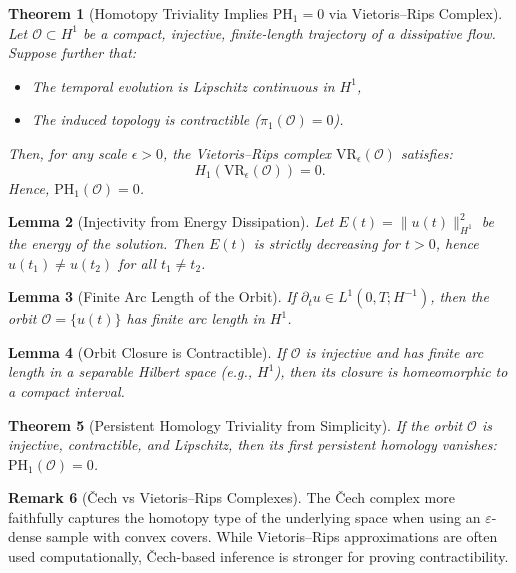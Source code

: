 \documentclass[11pt]{article}
\newtheorem{theorem}{Theorem}[section]
\newtheorem{lemma}[theorem]{Lemma}
\theoremstyle{definition}
\newtheorem{remark}[theorem]{Remark}
\begin{document}
\begin{theorem}[Homotopy Triviality Implies PH$_1 = 0$ via Vietoris–Rips Complex]
\label{thm:ph1_zero_vr}
Let $\mathcal{O} \subset H^1$ be a compact, injective, finite-length trajectory of a dissipative flow. Suppose further that:
\begin{itemize}
  \item The temporal evolution is Lipschitz continuous in $H^1$,
  \item The induced topology is contractible ($\pi_1(\mathcal{O}) = 0$).
\end{itemize}
Then, for any scale $\epsilon > 0$, the Vietoris--Rips complex $\mathrm{VR}_\epsilon(\mathcal{O})$ satisfies:
\[ H_1(\mathrm{VR}_\epsilon(\mathcal{O})) = 0. \]
Hence, $\mathrm{PH}_1(\mathcal{O}) = 0$.
\end{theorem}

\begin{lemma}[Injectivity from Energy Dissipation]
Let $E(t) = \|u(t)\|_{H^1}^2$ be the energy of the solution. Then $E(t)$ is strictly decreasing for $t > 0$, hence $u(t_1) \ne u(t_2)$ for all $t_1 \ne t_2$.
\end{lemma}

\begin{lemma}[Finite Arc Length of the Orbit]
If $\partial_t u \in L^1(0, T; H^{-1})$, then the orbit $\mathcal{O} = \{ u(t) \}$ has finite arc length in $H^1$.
\end{lemma}

\begin{lemma}[Orbit Closure is Contractible]
If $\mathcal{O}$ is injective and has finite arc length in a separable Hilbert space (e.g., $H^1$), then its closure is homeomorphic to a compact interval.
\end{lemma}

\begin{theorem}[Persistent Homology Triviality from Simplicity]
If the orbit $\mathcal{O}$ is injective, contractible, and Lipschitz, then its first persistent homology vanishes: $\mathrm{PH}_1(\mathcal{O}) = 0$.
\end{theorem}

\begin{remark}[Čech vs Vietoris–Rips Complexes]
The Čech complex more faithfully captures the homotopy type of the underlying space when using an $\varepsilon$-dense sample with convex covers. While Vietoris–Rips approximations are often used computationally, Čech-based inference is stronger for proving contractibility.
\end{remark}
\end{document}
